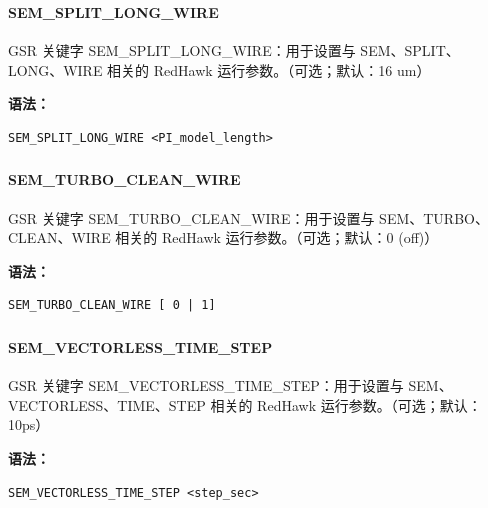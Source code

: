 \subsubsection{}
\paragraph*{SEM_SPLIT_LONG_WIRE}

GSR 关键字 SEM_SPLIT_LONG_WIRE：用于设置与 SEM、SPLIT、LONG、WIRE 相关的 RedHawk 运行参数。（可选；默认：16 um）

\textbf{语法：}
\begin{lstlisting}
SEM_SPLIT_LONG_WIRE <PI_model_length>
\end{lstlisting}

\subsubsection{}
\paragraph*{SEM_TURBO_CLEAN_WIRE}

GSR 关键字 SEM_TURBO_CLEAN_WIRE：用于设置与 SEM、TURBO、CLEAN、WIRE 相关的 RedHawk 运行参数。（可选；默认：0 (off)）

\textbf{语法：}
\begin{lstlisting}
SEM_TURBO_CLEAN_WIRE [ 0 | 1]
\end{lstlisting}

\subsubsection{}
\paragraph*{SEM_VECTORLESS_TIME_STEP}

GSR 关键字 SEM_VECTORLESS_TIME_STEP：用于设置与 SEM、VECTORLESS、TIME、STEP 相关的 RedHawk 运行参数。（可选；默认：10ps）

\textbf{语法：}
\begin{lstlisting}
SEM_VECTORLESS_TIME_STEP <step_sec>
\end{lstlisting}

\subsubsection{}
